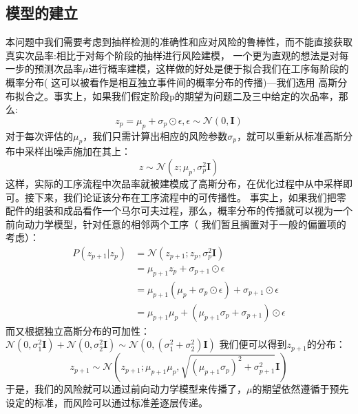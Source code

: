 \documentclass[withoutpreface,bwprint]{cumcmthesis} %
\begin{document}
\subsection{模型的建立}
本问题中我们需要考虑到抽样检测的准确性和应对风险的鲁棒性，而不能直接获取真实次品率:相比于对每个阶段的抽样进行风险建模，
一个更为直观的想法是对每一步的预测次品率$\mu$进行概率建模，这样做的好处是便于拟合我们在工序每阶段的概率分布(
这可以被看作是相互独立事件间的概率分布的传播)---我们选用
高斯分布拟合之。事实上，如果我们假定阶段p的期望为问题二及三中给定的次品率，那么:
\begin{equation}
	z_p = \mu_p + \sigma_p \odot \epsilon, \epsilon \sim \mathcal{N}(0, \mathbf{I})
\end{equation}
对于每次评估的$\mu_p$，我们只需计算出相应的风险参数$\sigma_p$，就可以重新从标准高斯分布中采样出噪声施加在其上：
\begin{equation}
	z \sim \mathcal{N}(z; \mu_p, \sigma_p^2 \mathbf{I})
\end{equation}
这样，实际的工序流程中次品率就被建模成了高斯分布，在优化过程中从中采样即可。接下来，我们论证该分布在工序流程中的可传播性。
事实上，如果我们把零配件的组装和成品看作一个马尔可夫过程，那么，概率分布的传播就可以视为一个前向动力学模型，针对任意的相邻两个工序（
我们暂且搁置对于一般的偏置项的考虑）：
\begin{equation}
	\begin{split}
		P(z_{p+1} | z_p) &= \mathcal{N}(z_{p+1};z_p, \sigma_p^2 \mathbf{I}) \\
		&= \mu_{p+1}z_p + \sigma_{p+1} \odot \epsilon \\
		& = \mu_{p+1}(\mu_p + \sigma_p \odot \epsilon) + \sigma_{p+1} \odot \epsilon \\
		& = \mu_{p+1}\mu_p + (\mu_{p+1}\sigma_p + \sigma_{p+1} )\odot \epsilon
	\end{split}
\end{equation}
而又根据独立高斯分布的可加性：$\mathcal{N}(0, \sigma_1^2 \mathbf{I}) + \mathcal{N}(0, \sigma_2^2 \mathbf{I}) \sim \mathcal{N}(0, (\sigma_1^2 + \sigma_2^2) \mathbf{I})$
我们便可以得到$z_{p+1}$的分布：
\begin{equation}
	z_{p+1} \sim \mathcal{N}(z_{p+1}; \mu_{p+1}\mu_p, \sqrt{(\mu_{p+1}\sigma_p)^2 +\sigma_{p+1}^2}\mathbf{I})
\end{equation}
于是，我们的风险就可以通过前向动力学模型来传播了，$\mu$的期望依然遵循于预先设定的标准，而风险可以通过标准差逐层传递。
\end{document}

